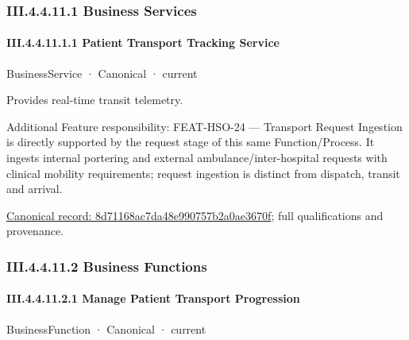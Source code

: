 \subsubsection*{III.4.4.11.1 Business Services}
\label{navigation:III.4.4.11.1}

\paragraph*{III.4.4.11.1.1 Patient Transport Tracking Service}
\label{navigation:III.4.4.11.1.1}

\label{element:8d71168ac7da48e990757b2a0ae3670f}
{\small BusinessService · Canonical · current}\par

Provides real-time transit telemetry.



Additional Feature responsibility: FEAT-HSO-24 — Transport Request Ingestion is directly supported by the request stage of this same Function/Process. It ingests internal portering and external ambulance/inter-hospital requests with clinical mobility requirements; request ingestion is distinct from dispatch, transit and arrival.


{\footnotesize \href{../../../../continuum/business/business-service/8d71168ac7da48e990757b2a0ae3670f.md}{Canonical record: 8d71168ac7da48e990757b2a0ae3670f}; full qualifications and provenance.}\par
\subsubsection*{III.4.4.11.2 Business Functions}
\label{navigation:III.4.4.11.2}

\paragraph*{III.4.4.11.2.1 Manage Patient Transport Progression}
\label{navigation:III.4.4.11.2.1}

\label{element:8a2136544646458fb60413afed2b66e1}
{\small BusinessFunction · Canonical · current}\par

